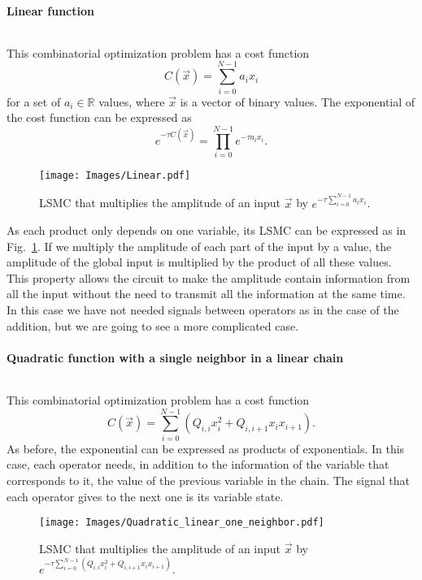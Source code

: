 \paragraph{Linear function}
$ $

This combinatorial optimization problem has a cost function
\begin{equation}
    C(\vec{x})=\sum_{i=0}^{N-1} a_i x_i
\end{equation}
for a set of $a_i\in \mathbb{R}$ values, where $\vec{x}$ is a vector of binary values. The exponential of the cost function can be expressed as
\begin{equation}
    e^{-\tau C(\vec{x})} = \prod_{i=0}^{N-1} e^{-\tau a_i x_i}.
\end{equation}

\begin{figure}
    \centering
    \texttt{[image: Images/Linear.pdf]}
    \caption{LSMC that multiplies the amplitude of an input $\vec{x}$ by $e^{-\tau \sum_{i=0}^{N-1} a_i x_i}$.}
    \label{fig: Linear circuit}
\end{figure}

As each product only depends on one variable, its LSMC can be expressed as in Fig.~\ref{fig: Linear circuit}. If we multiply the amplitude of each part of the input by a value, the amplitude of the global input is multiplied by the product of all these values. This property allows the circuit to make the amplitude contain information from all the input without the need to transmit all the information at the same time. In this case we have not needed signals between operators as in the case of the addition, but we are going to see a more complicated case.


\paragraph{Quadratic function with a single neighbor in a linear chain}
$ $

This combinatorial optimization problem has a cost function
\begin{equation}
    C(\vec{x})=\sum_{i=0}^{N-1} (Q_{i,i} x_i^2 + Q_{i,i+1} x_ix_{i+1}).
\end{equation}
As before, the exponential can be expressed as products of exponentials. In this case, each operator needs, in addition to the information of the variable that corresponds to it, the value of the previous variable in the chain. The signal that each operator gives to the next one is its variable state.
\begin{figure}
    \centering
    \texttt{[image: Images/Quadratic\_linear\_one\_neighbor.pdf]}
    \caption{LSMC that multiplies the amplitude of an input $\vec{x}$ by $e^{-\tau \sum_{i=0}^{N-1} (Q_{i,i} x_i^2 + Q_{i,i+1}x_ix_{i+1})}$.}
    \label{fig: Quadratic one neighbor circuit}
\end{figure}

